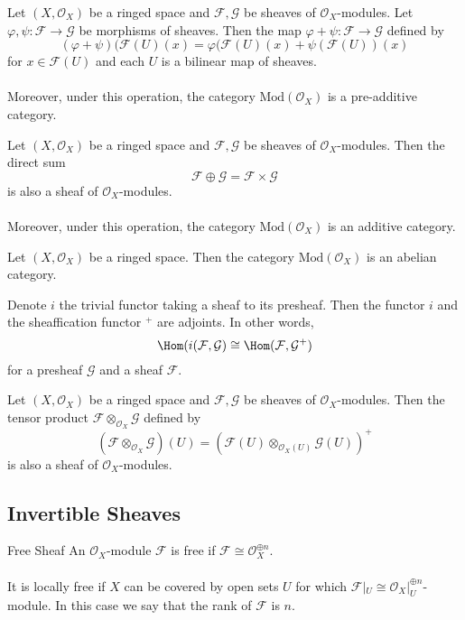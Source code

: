 \documentclass[a4paper]{article}
\begin{document}
\begin{prp}{}{} Let $(X,\mathcal{O}_X)$ be a ringed space and $\mathcal{F},\mathcal{G}$ be sheaves of $\mathcal{O}_X$-modules. Let $\varphi,\psi:\mathcal{F}\to\mathcal{G}$ be morphisms of sheaves. Then the map $\varphi+\psi:\mathcal{F}\to\mathcal{G}$ defined by $$(\varphi+\psi)(\mathcal{F}(U)(x)=\varphi(\mathcal{F}(U)(x)+\psi(\mathcal{F}(U))(x)$$ for $x\in\mathcal{F}(U)$ and each $U$ is a bilinear map of sheaves. \\~\\
Moreover, under this operation, the category $\text{Mod}(\mathcal{O}_X)$ is a pre-additive category. 
\end{prp}

\begin{prp}{}{} Let $(X,\mathcal{O}_X)$ be a ringed space and $\mathcal{F},\mathcal{G}$ be sheaves of $\mathcal{O}_X$-modules. Then the direct sum $$\mathcal{F}\oplus\mathcal{G}=\mathcal{F}\times\mathcal{G}$$ is also a sheaf of $\mathcal{O}_X$-modules. \\~\\
Moreover, under this operation, the category $\text{Mod}(\mathcal{O}_X)$ is an additive category. 
\end{prp}

\begin{prp}{}{} Let $(X,\mathcal{O}_X)$ be a ringed space. Then the category $\text{Mod}(\mathcal{O}_X)$ is an abelian category. 
\end{prp}

\begin{prp}{}{} Denote $i$ the trivial functor taking a sheaf to its presheaf. Then the functor $i$ and the sheaffication functor $^+$ are adjoints. In other words, $$\Hom(i(\mathcal{F},\mathcal{G})\cong\Hom(\mathcal{F},\mathcal{G}^+)$$ for a presheaf $\mathcal{G}$ and a sheaf $\mathcal{F}$. 
\end{prp}

\begin{prp}{}{} Let $(X,\mathcal{O}_X)$ be a ringed space and $\mathcal{F},\mathcal{G}$ be sheaves of $\mathcal{O}_X$-modules. Then the tensor product $\mathcal{F}\otimes_{\mathcal{O}_X}\mathcal{G}$ defined by $$(\mathcal{F}\otimes_{\mathcal{O}_X}\mathcal{G})(U)=(\mathcal{F}(U)\otimes_{\mathcal{O}_X(U)}\mathcal{G}(U))^+$$ is also a sheaf of $\mathcal{O}_X$-modules. 
\end{prp}

\subsection{Invertible Sheaves}
\begin{defn}{Free Sheaf}{} An $\mathcal{O}_X$-module $\mathcal{F}$ is free if $\mathcal{F}\cong\mathcal{O}_X^{\oplus n}$. \\~\\
It is locally free if $X$ can be covered by open sets $U$ for which $\mathcal{F}|_U\cong\mathcal{O}_X|_U^{\oplus n}$-module. In this case we say that the rank of $\mathcal{F}$ is $n$. 
\end{defn}
\end{document}
